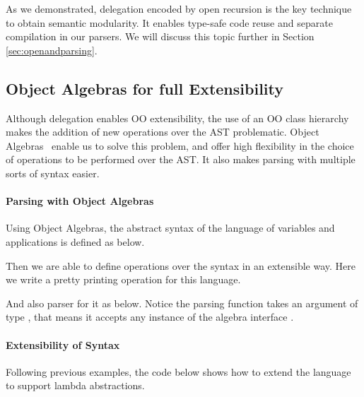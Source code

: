 
As we demonstrated, delegation encoded by open recursion is the key technique to obtain semantic modularity. It enables type-safe code reuse and separate compilation in our parsers. We will discuss this topic further in Section \ref{sec:openandparsing}.

\subsection{Object Algebras for full Extensibility}\label{subsec:overview-oa}

Although delegation enables OO extensibility, the use of an OO class
hierarchy makes the addition of new operations over the AST
problematic. Object Algebras~\cite{Oliveira2012} enable us to solve this problem, and
offer high flexibility in the choice of operations to be performed
over the AST. It also makes parsing with multiple sorts of syntax easier.

\paragraph{Parsing with Object Algebras} Using Object Algebras, the abstract syntax of the language of variables and applications is defined as below.


Then we are able to define operations over the syntax in an extensible way. Here we write a pretty printing operation for this language.


And also parser for it as below. Notice the parsing function  takes an argument of type , that means it accepts any instance of the algebra interface .


\paragraph{Extensibility of Syntax} Following previous examples, the code below shows how to extend the language to support lambda abstractions.

